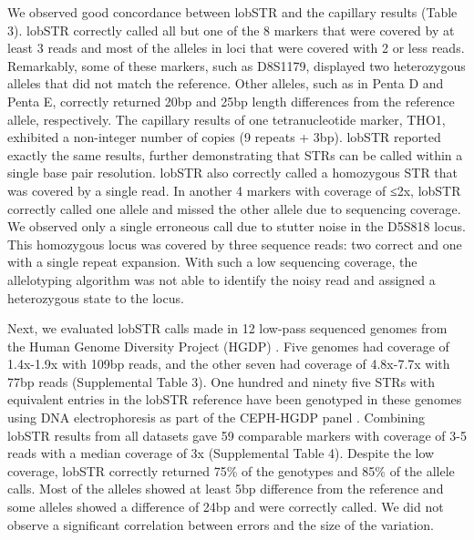 We observed good concordance between lobSTR and the capillary results (Table 3). lobSTR correctly called all but one of the 8 markers that were covered by at least 3 reads and most of the alleles in loci that were covered with 2 or less reads. Remarkably, some of these markers, such as D8S1179, displayed two heterozygous alleles that did not match the reference. Other alleles, such as in Penta D and Penta E, correctly returned 20bp and 25bp length differences from the reference allele, respectively. The capillary results of one tetranucleotide marker, THO1, exhibited a non-integer number of copies (9 repeats + 3bp). lobSTR reported exactly the same results, further demonstrating that STRs can be called within a single base pair resolution. lobSTR also correctly called a homozygous STR that was covered by a single read. In another 4 markers with coverage of ≤2x, lobSTR correctly called one allele and missed the other allele due to sequencing coverage. We observed only a single erroneous call due to stutter noise in the D5S818 locus. This homozygous locus was covered by three sequence reads: two correct and one with a single repeat expansion. With such a low sequencing coverage, the allelotyping algorithm was not able to identify the noisy read and assigned a heterozygous state to the locus. 

Next, we evaluated lobSTR calls made in 12 low-pass sequenced genomes from the Human Genome Diversity Project (HGDP) \cite{GreenKrauseBriggsEtAl2010,ReichGreenKircherEtAl2010}. Five genomes had coverage of 1.4x-1.9x with 109bp reads, and the other seven had coverage of 4.8x-7.7x with 77bp reads (Supplemental Table 3). One hundred and ninety five STRs with equivalent entries in the lobSTR reference have been genotyped in these genomes using DNA electrophoresis as part of the CEPH-HGDP panel \cite{RamachandranDeshpandeRosemanEtAl2005,PembertonSandefurJakobssonEtAl2009}. Combining lobSTR results from all datasets gave 59 comparable markers with coverage of 3-5 reads with a median coverage of 3x (Supplemental Table 4). Despite the low coverage, lobSTR correctly returned 75\% of the genotypes and 85\% of the allele calls. Most of the alleles showed at least 5bp difference from the reference and some alleles showed a difference of 24bp and were correctly called. We did not observe a significant correlation between errors and the size of the variation. 

